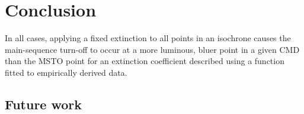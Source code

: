\documentclass[12pt, a4paper]{report}
\begin{document}
\chapter{Conclusion}
In all cases, applying a fixed extinction to all points in an isochrone causes the main-sequence turn-off to occur at a more luminous, bluer point in a given CMD than the MSTO point for an extinction coefficient described using a function fitted to empirically derived data.

\section{Future work}

%

\end{document}
